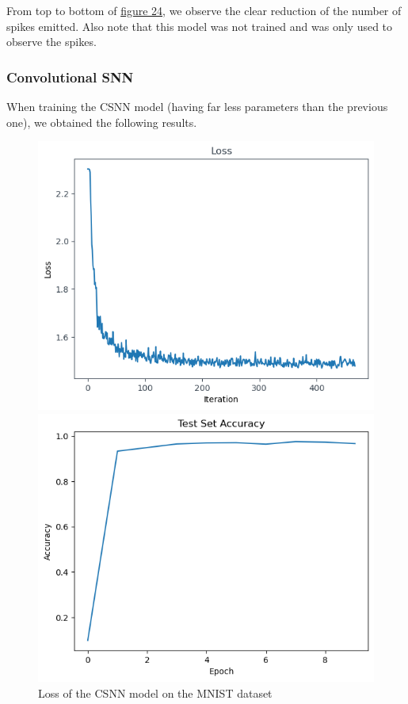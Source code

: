 \documentclass[11pt]{article}
\begin{document}
From top to bottom of \hyperref[fig:mnist1]{figure 24}, we observe the clear reduction of the number of spikes emitted. Also note that this model was not trained and was only used to observe the spikes.

\subsubsection*{Convolutional SNN}

When training the CSNN model (having far less parameters than the previous one), we obtained the following results.

\begin{figure}[H]
  \begin{minipage}{0.5\textwidth}
    \begin{center}
      \includegraphics[width=\textwidth]{image/loss_MNIST.png}
      \caption{Loss of the CSNN model on the MNIST dataset}
      \label{fig:loss_MNIST}
    \end{center}
  \end{minipage}
  \hspace{0.5cm}
  \begin{minipage}{0.5\textwidth}
    \begin{center}
      \includegraphics[width=\textwidth]{image/accuracy_MNIST.png}

\end{center}
\end{minipage}
\end{figure}
\end{document}
